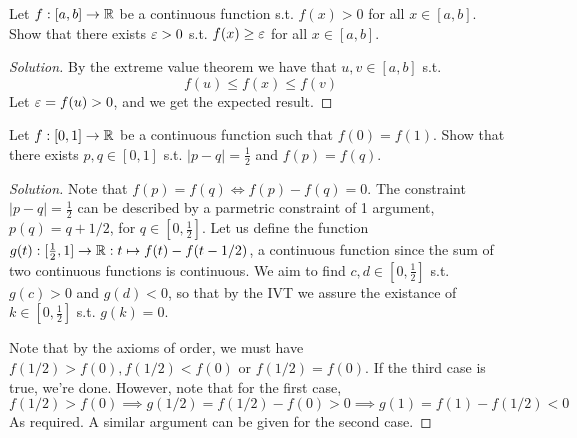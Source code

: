 \begin{example}
  Let $f:[a,b]\to\mathbb R$ be a continuous function s.t. $f(x)>0$ for all $x\in[a,b]$. Show
  that there exists $\varepsilon >0$ s.t. $f(x)\geq \varepsilon$ for all $x\in[a,b]$.
\end{example}
\begin{proof}[Solution]
  By the extreme value theorem we have that $u,v\in[a,b]$ s.t. 
  \[f(u)\leq f(x) \leq f(v)\]
  Let $\varepsilon=f(u)>0$, and we get the expected result.
\end{proof}


\begin{example}
  Let $f:[0,1]\to\mathbb R$ be a continuous function such that $f(0)=f(1)$. Show that there
  exists $p,q\in[0,1]$ s.t. $|p-q|=\frac{1}{2}$ and $f(p)=f(q)$.
\end{example}
\begin{proof}[Solution]
  Note that $f(p)=f(q) \iff f(p)-f(q)=0$. The constraint
  $|p-q|=\frac{1}{2}$ can be described by a parmetric constraint of 1 argument,
  $p(q)=q+1/2$, for $q\in[0,\frac{1}{2}]$. Let us define the function
  $g(t):[\frac{1}{2},1]\to\mathbb R:t\mapsto f(t)-f(t-1/2)$, a continuous function since the sum
  of two continuous functions is continuous. We aim to find $c,d\in [0,\frac{1}{2}]$ s.t.
  $g(c)>0$ and $g(d)<0$, so that by the IVT we assure the existance of
  $k\in[0,\frac{1}{2}]$ s.t. $g(k)=0$. 

  Note that by the axioms of order, we must have $f(1/2)>f(0), f(1/2)<f(0)$ or
  $f(1/2)=f(0)$. If the third case is true, we're done. However, note that for the first
  case,
  \[f(1/2)>f(0)\implies g(1/2)= f(1/2)-f(0)>0 \implies g(1)=f(1)-f(1/2)<0\] 
  As required. A similar argument can be given for the second case.
\end{proof}


